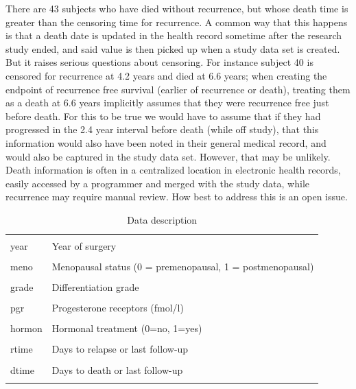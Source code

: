 \documentclass[
]{article}
\begin{document}
There are 43 subjects who have died without recurrence, but whose death
time is greater than the censoring time for recurrence. A common way
that this happens is that a death date is updated in the health record
sometime after the research study ended, and said value is then picked
up when a study data set is created. But it raises serious questions
about censoring. For instance subject 40 is censored for recurrence at
4.2 years and died at 6.6 years; when creating the endpoint of
recurrence free survival (earlier of recurrence or death), treating them
as a death at 6.6 years implicitly assumes that they were recurrence
free just before death. For this to be true we would have to assume that
if they had progressed in the 2.4 year interval before death (while off
study), that this information would also have been noted in their
general medical record, and would also be captured in the study data
set. However, that may be unlikely. Death information is often in a
centralized location in electronic health records, easily accessed by a
programmer and merged with the study data, while recurrence may require
manual review. How best to address this is an open issue.

\begin{table}[!h]

\caption{\label{tab:data-desc}Data description}
\centering
\begin{tabular}[t]{ll}
\toprule
\cellcolor{gray!6}{pid} & \cellcolor{gray!6}{Patient identifier}\\
year & Year of surgery\\
\cellcolor{gray!6}{age} & \cellcolor{gray!6}{Age at surgery}\\
meno & Menopausal status (0 = premenopausal, 1 = postmenopausal)\\
\cellcolor{gray!6}{size} & \cellcolor{gray!6}{Tumor size, a factor with levels <= 20, 20-25, > 50}\\
\addlinespace
grade & Differentiation grade\\
\cellcolor{gray!6}{nodes} & \cellcolor{gray!6}{Number of positive lymph nodes}\\
pgr & Progesterone receptors (fmol/l)\\
\cellcolor{gray!6}{er} & \cellcolor{gray!6}{Estrogen receptors (fmol/l)}\\
hormon & Hormonal treatment (0=no, 1=yes)\\
\addlinespace
\cellcolor{gray!6}{chemo} & \cellcolor{gray!6}{Chemotherapy}\\
rtime & Days to relapse or last follow-up\\
\cellcolor{gray!6}{recur} & \cellcolor{gray!6}{0 = no relapse, 1 = relapse}\\
dtime & Days to death or last follow-up\\
\cellcolor{gray!6}{death} & \cellcolor{gray!6}{0 = alive, 1 = dead}\\
\bottomrule
\end{tabular}
\end{table}
\end{document}
